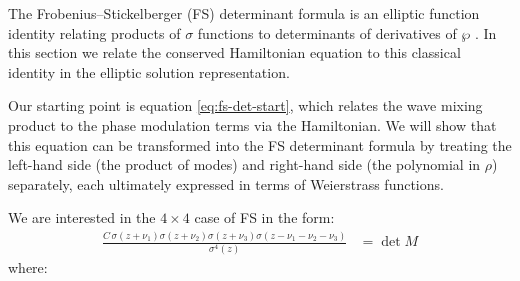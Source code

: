 \documentclass[11pt,a4paper]{article}
\numberwithin{equation}{section}
\begin{document}
The Frobenius--Stickelberger (FS) determinant formula is an elliptic function identity relating products of $\sigma$ functions to determinants of derivatives of $\wp$ \cite{whittakerCourseModernAnalysis2021, frobeniusZurTheorieElliptischen1877}.
In this section we relate the conserved Hamiltonian equation to this classical identity in the elliptic solution representation.

Our starting point is equation \eqref{eq:fs-det-start}, which relates the wave mixing product to the phase modulation terms via the Hamiltonian.
We will show that this equation can be transformed into the FS determinant formula by treating the left-hand side (the product of modes) and right-hand side (the polynomial in $\rho$) separately, each ultimately expressed in terms of Weierstrass functions.

We are interested in the $4\times4$ case of FS in the form:
\begin{align}
\label{eq:fs-det-m}
\frac{C\,\sigma{\left(z + {\nu}_{1}\right)} \sigma{\left(z + {\nu}_{2}\right)} \sigma{\left(z + {\nu}_{3}\right)} \sigma{\left(z - {\nu}_{1} - {\nu}_{2} - {\nu}_{3}\right)}}{\sigma^{4}{\left(z\right)}} & = \det M
\end{align}
where:
\end{document}
